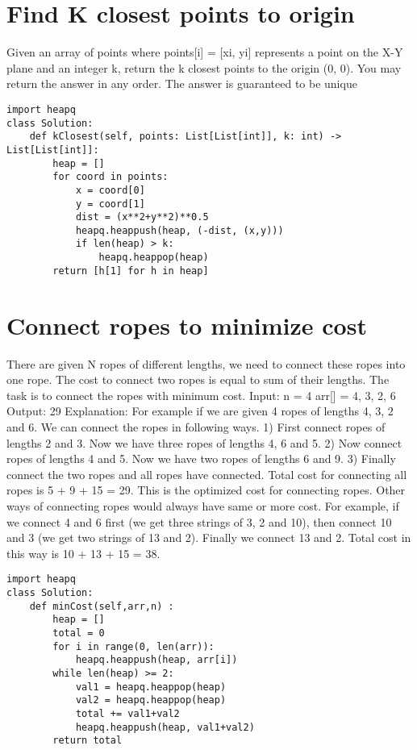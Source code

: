\documentclass[24pt, a4]{article}
\begin{document}
\newpage
\section{Find K closest points to origin}
Given an array of points where points[i] = [xi, yi] represents a point on the 
X-Y plane and an integer k, return the k closest points to the origin (0, 0).
You may return the answer in any order. The answer is guaranteed to be unique 
\begin{lstlisting}
import heapq
class Solution:
    def kClosest(self, points: List[List[int]], k: int) -> List[List[int]]:
        heap = []
        for coord in points:
            x = coord[0]
            y = coord[1]
            dist = (x**2+y**2)**0.5
            heapq.heappush(heap, (-dist, (x,y)))
            if len(heap) > k:
                heapq.heappop(heap)
        return [h[1] for h in heap]
\end{lstlisting}
\section{Connect ropes to minimize cost}
There are given N ropes of different lengths, we need to connect these ropes 
into one rope. The cost to connect two ropes is equal to sum of their lengths.
The task is to connect the ropes with minimum cost.
Input: n = 4 arr[] = {4, 3, 2, 6} Output: 29
Explanation:
For example if we are given 4 ropes of lengths 4, 3, 2 and 6. We can connect 
the ropes in following ways. 1) First connect ropes of lengths 2 and 3.
Now we have three ropes of lengths 4, 6 and 5.
2) Now connect ropes of lengths 4 and 5.
Now we have two ropes of lengths 6 and 9.
3) Finally connect the two ropes and all
ropes have connected.
Total cost for connecting all ropes is 5
+ 9 + 15 = 29. This is the optimized cost
for connecting ropes. Other ways of
connecting ropes would always have same
or more cost. For example, if we connect
4 and 6 first (we get three strings of 3,
2 and 10), then connect 10 and 3 (we get
two strings of 13 and 2). Finally we
connect 13 and 2. Total cost in this way
is 10 + 13 + 15 = 38.
\begin{lstlisting}
import heapq
class Solution:
    def minCost(self,arr,n) :
        heap = []
        total = 0
        for i in range(0, len(arr)):
            heapq.heappush(heap, arr[i])
        while len(heap) >= 2:
            val1 = heapq.heappop(heap)
            val2 = heapq.heappop(heap)
            total += val1+val2
            heapq.heappush(heap, val1+val2)
        return total
\end{lstlisting}
\newpage
\end{document}
